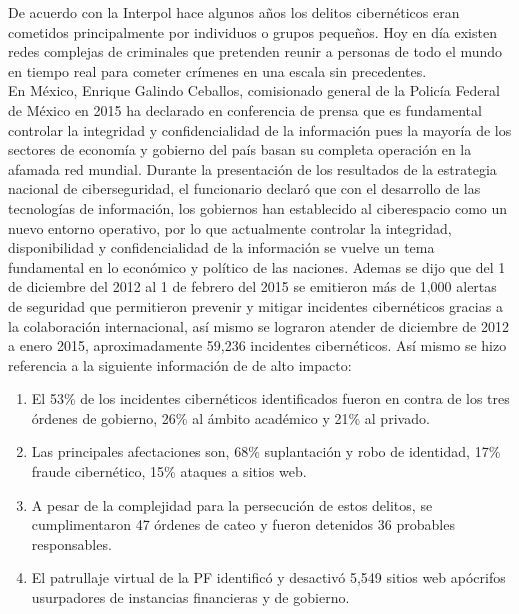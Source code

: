 \documentclass[runningheads,a4paper]{llncs}
\begin{document}
De acuerdo con la Interpol \cite{Interpol_1} hace algunos años los delitos cibernéticos eran cometidos principalmente por individuos o grupos pequeños. Hoy en día existen redes complejas de criminales que pretenden reunir a personas de todo el mundo en tiempo real para cometer crímenes en una escala sin precedentes.\\

En México, Enrique Galindo Ceballos, comisionado general de la Policía Federal de México en 2015 ha declarado en conferencia de prensa \cite{Forbes_1} que es fundamental controlar la integridad y confidencialidad de la información pues la mayoría de los sectores de economía y gobierno del país basan su completa operación en la afamada red mundial. Durante la presentación de los resultados de la estrategia nacional de ciberseguridad, el funcionario declaró que con el desarrollo de las tecnologías de información, los gobiernos han establecido al ciberespacio como un nuevo entorno operativo, por lo que actualmente controlar la integridad, disponibilidad y confidencialidad de la información se vuelve un tema fundamental en lo económico y político de las naciones. Ademas se dijo que del 1 de diciembre del 2012 al 1 de febrero del 2015 se emitieron más de 1,000 alertas de seguridad que permitieron prevenir y mitigar incidentes cibernéticos gracias a la colaboración internacional, así mismo se lograron atender de diciembre de 2012 a enero 2015, aproximadamente 59,236 incidentes cibernéticos. Así mismo se hizo referencia a la siguiente información de de alto impacto: 

\begin{enumerate}
	\item El 53\% de los incidentes cibernéticos identificados fueron en contra de los tres órdenes de gobierno, 26\% al ámbito académico y 21\% al privado.\\
	\item Las principales afectaciones son, 68\% suplantación y robo de identidad, 17\% fraude cibernético, 15\% ataques a sitios web.\\
	\item A pesar de la complejidad para la persecución de estos delitos, se cumplimentaron 47 órdenes de cateo y fueron detenidos 36 probables responsables.\\
	\item El patrullaje virtual de la \gls{PF} identificó y desactivó 5,549 sitios web apócrifos usurpadores de instancias financieras y de gobierno.
\end{enumerate}
\end{document}
